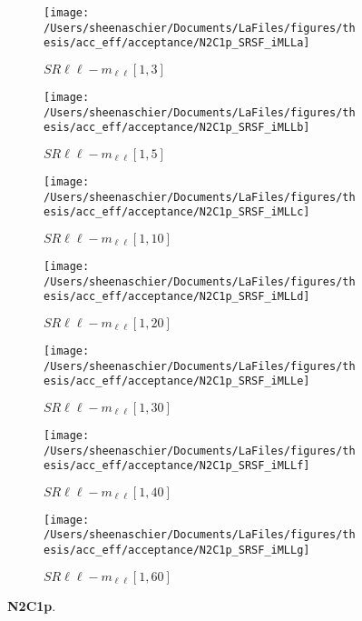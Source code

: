 \begin{figure}
        \centering
    \begin{subfigure}[b]{0.49\textwidth}
        \texttt{[image: /Users/sheenaschier/Documents/LaFiles/figures/thesis/acc\_eff/acceptance/N2C1p\_SRSF\_iMLLa]}
    \caption{$SR\ell\ell-m_{\ell\ell} [1, 3]$}
    \end{subfigure}
    \begin{subfigure}[b]{0.49\textwidth}
        \texttt{[image: /Users/sheenaschier/Documents/LaFiles/figures/thesis/acc\_eff/acceptance/N2C1p\_SRSF\_iMLLb]}
    \caption{$SR\ell\ell-m_{\ell\ell} [1, 5]$}
    \end{subfigure}
    \begin{subfigure}[b]{0.49\textwidth}
        \texttt{[image: /Users/sheenaschier/Documents/LaFiles/figures/thesis/acc\_eff/acceptance/N2C1p\_SRSF\_iMLLc]}
    \caption{$SR\ell\ell-m_{\ell\ell} [1, 10]$}
    \end{subfigure}
    \begin{subfigure}[b]{0.49\textwidth}
        \texttt{[image: /Users/sheenaschier/Documents/LaFiles/figures/thesis/acc\_eff/acceptance/N2C1p\_SRSF\_iMLLd]}
    \caption{$SR\ell\ell-m_{\ell\ell} [1, 20]$}
    \end{subfigure}
    \begin{subfigure}[b]{0.49\textwidth}
        \texttt{[image: /Users/sheenaschier/Documents/LaFiles/figures/thesis/acc\_eff/acceptance/N2C1p\_SRSF\_iMLLe]}
    \caption{$SR\ell\ell-m_{\ell\ell} [1, 30]$}
    \end{subfigure}
    \begin{subfigure}[b]{0.49\textwidth}
        \texttt{[image: /Users/sheenaschier/Documents/LaFiles/figures/thesis/acc\_eff/acceptance/N2C1p\_SRSF\_iMLLf]}
    \caption{$SR\ell\ell-m_{\ell\ell} [1, 40]$}
    \end{subfigure}
    \begin{subfigure}[b]{0.49\textwidth}
        \texttt{[image: /Users/sheenaschier/Documents/LaFiles/figures/thesis/acc\_eff/acceptance/N2C1p\_SRSF\_iMLLg]}
    \caption{$SR\ell\ell-m_{\ell\ell} [1, 60]$}
    \end{subfigure}
    \caption{\textbf{N2C1p}.}
\end{figure}

